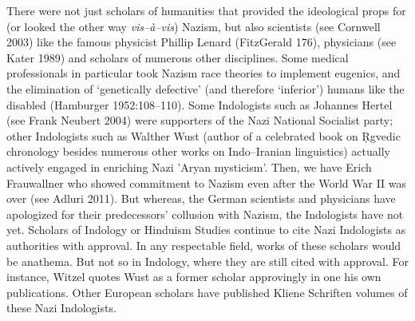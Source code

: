 There were not just scholars of humanities that provided the ideological props for (or looked the other way \textit{vis–à–vis}) Nazism, but also scientists (see Cornwell 2003) like the famous physicist Phillip Lenard (FitzGerald 176), physicians (see Kater 1989) and scholars of numerous other disciplines. Some medical professionals in particular took Nazism race theories to implement eugenics, and the elimination of ‘genetically defective’ (and therefore ‘inferior’) humans like the disabled (Hamburger 1952:108–110). Some Indologists such as Johannes Hertel (see Frank Neubert 2004) were supporters of the Nazi National Socialist party; other Indologists such as Walther Wust (author of a celebrated book on Ṛgvedic chronology besides numerous other works on Indo–Iranian linguistics) actually actively engaged in enriching Nazi 'Aryan mysticism'. Then, we have Erich Frauwallner who showed commitment to Nazism even after the World War II was over (see Adluri 2011). But whereas, the German scientists and physicians have apologized for their predecessors’ collusion with Nazism, the Indologists have not yet. Scholars of Indology or Hinduism Studies continue to cite Nazi Indologists as authorities with approval. In any respectable field, works of these scholars would be anathema. But not so in Indology, where they are still cited with approval. For instance, Witzel quotes Wust as a former scholar approvingly in one his own publications. Other European scholars have published Kliene Schriften volumes of these Nazi Indologists.

